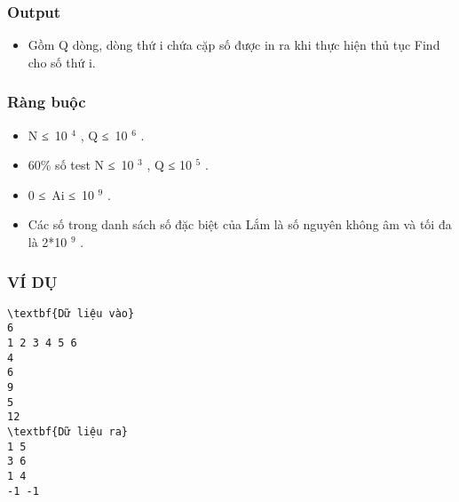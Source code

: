\subsubsection{\textbf{Output}}
\begin{itemize}
	\item Gồm Q dòng, dòng thứ i chứa cặp số được in ra khi thực hiện thủ tục Find cho số thứ i.
\end{itemize}

\subsubsection{\textbf{Ràng buộc}}
\begin{itemize}
	\item N ≤ 10 $^ 4 $ , Q ≤ 10 $^ 6 $ .
	\item 60\% số test N ≤ 10 $^ 3 $ , Q ≤ 10 $^ 5 $ .
	\item 0 ≤ Ai ≤ 10 $^ 9 $ .
	\item Các số trong danh sách số đặc biệt của Lắm là số nguyên không âm và tối đa là 2*10 $^ 9 $ .
\end{itemize}

\subsubsection{\textbf{VÍ DỤ }}
\begin{verbatim}
\textbf{Dữ liệu vào}
6
1 2 3 4 5 6
4
6
9
5
12
\textbf{Dữ liệu ra}
1 5
3 6
1 4
-1 -1
\end{verbatim}
